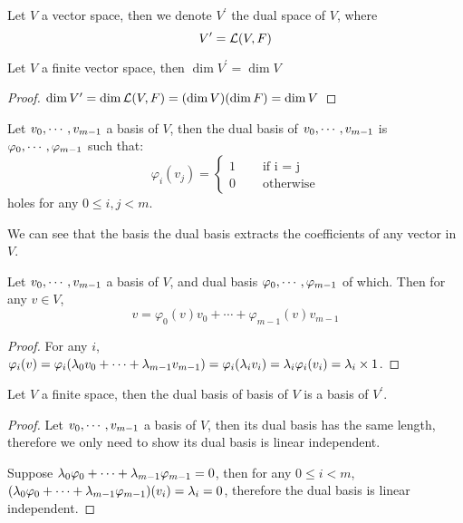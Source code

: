 \documentclass[../main.tex]{subfiles}
\begin{document}
\setcounter{definition}{109}
\begin{definition}
  Let $V$ a vector space, then we denote $V^\prime$ the dual space of $V$, where
  \[
  V^\prime = \LT(V, F)
  \]
\end{definition}

\setcounter{theorem}{\value{definition}}
\begin{theorem}
  Let $V$ a finite vector space, then $\dim V^\prime = \dim V$
\end{theorem}
\begin{proof}
  $\dim V^\prime = \dim \LT(V, F) = (\dim V)(\dim F) = \dim V$
\end{proof}

\setcounter{definition}{\value{theorem}}
\begin{definition}
  Let $\join{v}{m - 1}$ a basis of $V$, then the dual basis of $\join{v}{m - 1}$
  is $\join{\varphi}{m - 1}$ such that:
  \[
  \varphi_i(v_j) = \begin{cases}
    1 \quad & \text{ if i = j} \\
    0 \quad & \text{ otherwise}
  \end{cases}
  \]
  holes for any $0 \le i, j < m$.
\end{definition}

We can see that the basis the dual basis extracts the coefficients of
any vector in $V$.

\setcounter{theorem}{\value{definition}}
\begin{theorem}
  Let $\join{v}{m - 1}$ a basis of $V$, and dual basis $\join{\varphi}{m - 1}$ of which.
  Then for any $v \in V$,
  \[
  v = \varphi_0(v)v_0 + \cdots + \varphi_{m - 1}(v)v_{m - 1}
  \]
\end{theorem}
\begin{proof}
  For any $i$, $\varphi_i(v) = \varphi_i(\joinp[+]{\lambda}{v}{m - 1}) = \varphi_i(\lambda_iv_i) = \lambda_i\varphi_i(v_i) = \lambda_i \times 1$.
\end{proof}

\setcounter{theorem}{115}
\begin{theorem}
  Let $V$ a finite space, then the dual basis of basis of $V$ is a basis of $V^\prime$.
\end{theorem}
\begin{proof}
  Let $\join{v}{m - 1}$ a basis of $V$, then its dual basis has the same length,
  therefore we only need to show its dual basis is linear independent.

  Suppose $\joinp[+]{\lambda}{\varphi}{m - 1} = 0$, then for any $0 \le i < m$, $(\joinp[+]{\lambda}{\varphi}{m - 1})(v_i) = \lambda_i = 0$,
  therefore the dual basis is linear independent.
\end{proof}
\end{document}

